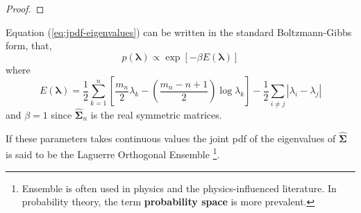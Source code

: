 \begin{proof}
\end{proof}

\begin{corollary}

\end{corollary}

\begin{remark}
    Equation (\ref{eq:jpdf-eigenvalues}) can be written in the standard Boltzmann-Gibbs form, that,
    \begin{equation}
        p\left(\boldsymbol{\lambda}\right)\propto\exp\left[-\beta E\left(\boldsymbol{\lambda}\right)\right]
    \end{equation}
    where
    \begin{equation}
        E\left(\boldsymbol{\lambda}\right)=\frac{1}{2}\sum_{k=1}^{n}\left[\frac{m_{n}}{2}\lambda_{k}-\left(\frac{m_{n}-n+1}{2}\right)\log\lambda_{k}\right]-\frac{1}{2}\sum_{i\neq j}\left|\lambda_{i}-\lambda_{j}\right|
    \end{equation}
    and $\beta=1$ since $\widehat{\boldsymbol{\Sigma}}_{n}$ is the real symmetric matrices.
\end{remark}

\begin{remark}
    If these parameters takes continuous values the joint pdf of the eigenvalues of $\widehat{\boldsymbol{\Sigma}}$ is said to be the Laguerre Orthogonal Ensemble \footnote{Ensemble is often used in physics and the physics-influenced literature. In probability theory, the term \textbf{probability space} is more prevalent.}.
\end{remark}


\begin{theorem}

\end{theorem}